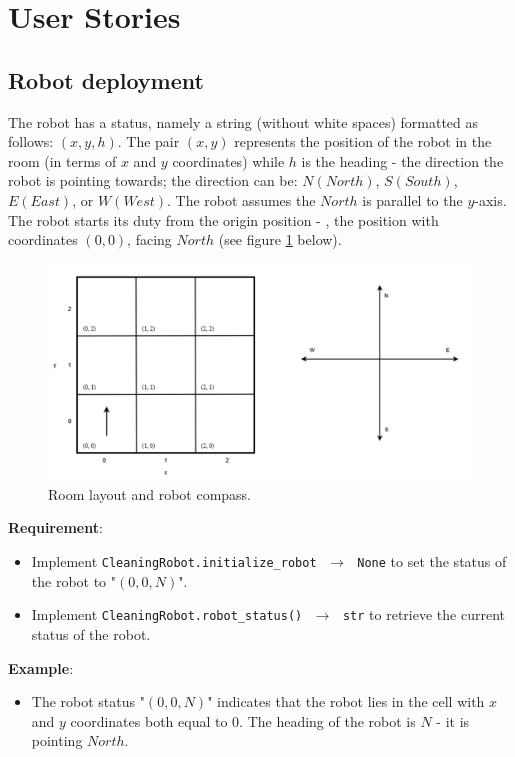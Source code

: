 \section{User Stories}
\subsection{Robot deployment}
The robot has a status, namely a string (without white spaces) formatted as follows: $(x,y,h)$. The pair $(x,y)$ represents the position of the robot in the room (in terms of $x$ and $y$ coordinates) while $h$ is the heading - \ie the direction the robot is pointing towards; the direction can be: $N (North)$, $S (South)$, $E (East)$, or $W (West)$. The robot assumes the $North$ is parallel to the $y$-axis. The robot starts its duty from the origin position - \ie, the position with coordinates $(0,0)$, facing $North$ (see figure \ref{room_and_compass} below).

\begin{figure}[H]
    \centering
    \includegraphics[width=\linewidth]{figures/appendix/cleaning_robot_1.png}
    \caption{Room layout and robot compass.}
    \label{room_and_compass}
\end{figure}

\noindent\textbf{Requirement}:
\begin{itemize}
    \item Implement \texttt{CleaningRobot.initialize\_robot $\,\to\,$ None} to set the status of the robot to "$(0,0,N)$".
    \item Implement \texttt{CleaningRobot.robot\_status()  $\,\to\,$ str} to retrieve the current status of the robot.
\end{itemize}

\noindent\textbf{Example}:
\begin{itemize}
    \item The robot status "$(0,0,N)$" indicates that the robot lies in the cell with $x$ and $y$ coordinates both equal to 0. The heading of the robot is $N$ - \ie it is pointing $North$.
\end{itemize}


